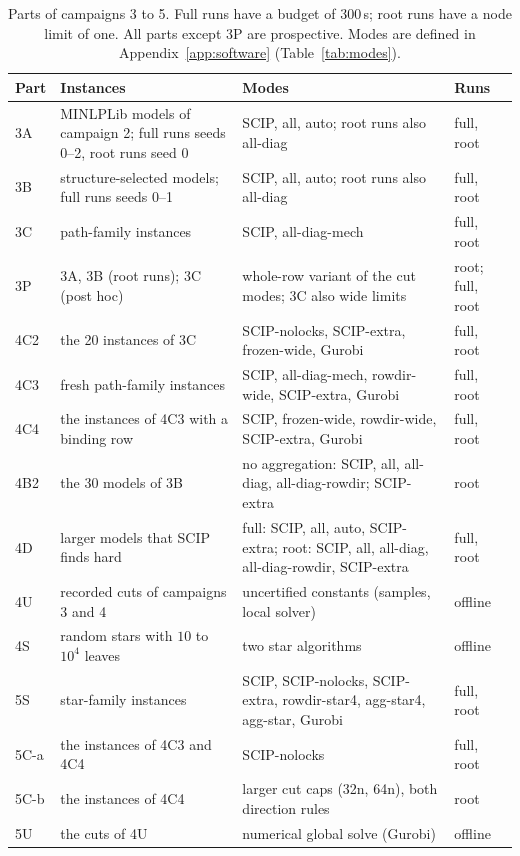 \begin{table}[t]
\centering\footnotesize
\caption{Parts of campaigns 3 to 5. Full runs have a budget of 300\,s; root
runs have a node limit of one. All parts except 3P are prospective. Modes are
defined in Appendix~\ref{app:software} (Table~\ref{tab:modes}).}\label{tab:overview}
\begin{tabular}{@{}l>{\raggedright\arraybackslash}p{}>{\raggedright\arraybackslash}p{}l@{}}
\toprule
Part & Instances & Modes & Runs\\
\midrule
3A & 30 MINLPLib models of campaign 2; full runs seeds 0--2, root runs seed 0 & SCIP, all, auto; root runs also all-diag & full, root\\
3B & 30 structure-selected models; full runs seeds 0--1 & SCIP, all, auto; root runs also all-diag & full, root\\
3C & 20 path-family instances & SCIP, all-diag-mech & full, root\\
3P & 3A, 3B (root runs); 3C (post hoc) & whole-row variant of the cut modes; 3C also wide limits & root; full, root\\
\midrule
4C2 & the 20 instances of 3C & SCIP-nolocks, SCIP-extra, frozen-wide, Gurobi & full, root\\
4C3 & 20 fresh path-family instances & SCIP, all-diag-mech, rowdir-wide, SCIP-extra, Gurobi & full, root\\
4C4 & the instances of 4C3 with a binding row & SCIP, frozen-wide, rowdir-wide, SCIP-extra, Gurobi & full, root\\
4B2 & the 30 models of 3B & no aggregation: SCIP, all, all-diag, all-diag-rowdir; SCIP-extra & root\\
4D & 20 larger models that SCIP finds hard & full: SCIP, all, auto, SCIP-extra; root: SCIP, all, all-diag, all-diag-rowdir, SCIP-extra & full, root\\
4U & recorded cuts of campaigns 3 and 4 & uncertified constants (samples, local solver) & offline\\
4S & random stars with $10$ to $10^4$ leaves & two star algorithms & offline\\
\midrule
5S & 30 star-family instances & SCIP, SCIP-nolocks, SCIP-extra, rowdir-star4, agg-star4, agg-star, Gurobi & full, root\\
5C-a & the instances of 4C3 and 4C4 & SCIP-nolocks & full, root\\
5C-b & the instances of 4C4 & larger cut caps (32n, 64n), both direction rules & root\\
5U & the cuts of 4U & numerical global solve (Gurobi) & offline\\
\bottomrule
\end{tabular}
\end{table}
